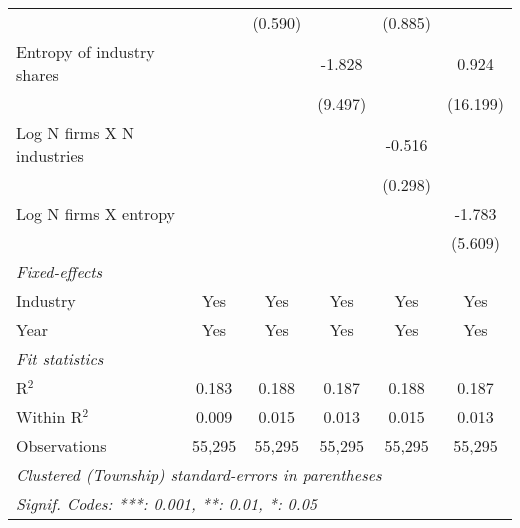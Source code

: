 \begin{tabular}{lccccc}
                                             &                 & (0.590)         &                 & (0.885)         &   \\   
   Entropy of industry shares                &                 &                 & -1.828          &                 & 0.924\\   
                                             &                 &                 & (9.497)         &                 & (16.199)\\   
   Log N firms X N industries                &                 &                 &                 & -0.516          &   \\   
                                             &                 &                 &                 & (0.298)         &   \\   
   Log N firms X entropy                     &                 &                 &                 &                 & -1.783\\   
                                             &                 &                 &                 &                 & (5.609)\\   
   \midrule
   \emph{Fixed-effects}\\
   Industry                                  & Yes             & Yes             & Yes             & Yes             & Yes\\  
   Year                                      & Yes             & Yes             & Yes             & Yes             & Yes\\  
   \midrule
   \emph{Fit statistics}\\
   R$^2$                                     & 0.183           & 0.188           & 0.187           & 0.188           & 0.187\\  
   Within R$^2$                              & 0.009           & 0.015           & 0.013           & 0.015           & 0.013\\  
   Observations                              & 55,295          & 55,295          & 55,295          & 55,295          & 55,295\\  
   \midrule \midrule
   \multicolumn{6}{l}{\emph{Clustered (Township) standard-errors in parentheses}}\\
   \multicolumn{6}{l}{\emph{Signif. Codes: ***: 0.001, **: 0.01, *: 0.05}}\\
\end{tabular}
\par\endgroup
